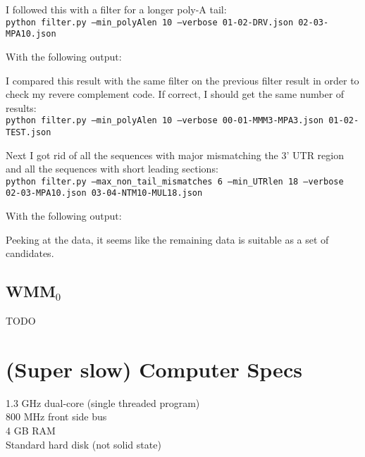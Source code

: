 \documentclass[a4paper, 12pt]{report}
\begin{document}
        I followed this with a filter for a longer poly-A tail: \\
        \texttt{python filter.py --min\_polyAlen 10 --verbose 01-02-DRV.json 02-03-MPA10.json}
    
        With the following output:
        
                
        I compared this result with the same filter on the previous filter result 
            in order to check my revere complement code.
        If correct, I should get the same number of results: \\
        \texttt{python filter.py --min\_polyAlen 10 --verbose 00-01-MMM3-MPA3.json 01-02-TEST.json}
        
        Next I got rid of all the sequences with major mismatching the 3' UTR region
            and all the sequences with short leading sections: \\
        \texttt{python filter.py --max\_non\_tail\_mismatches 6 --min\_UTRlen 18 --verbose \\
                02-03-MPA10.json 03-04-NTM10-MUL18.json}
    
        With the following output:
        
        Peeking at the data, it seems like the remaining data is suitable as a set of candidates.
        
    \subsection{WMM$_0$}
        TODO

\section{(Super slow) Computer Specs}
    1.3 GHz dual-core (single threaded program) \\
    800 MHz front side bus \\
    4 GB RAM \\
    Standard hard disk (not solid state)
\end{document}

